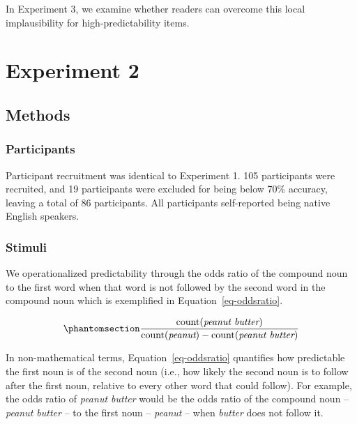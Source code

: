\documentclass[
  12pt,
  letterpaper,
]{scrreprt}
\begin{document}
In Experiment 3, we examine whether readers can overcome this local
implausibility for high-predictability items.

\section{Experiment 2}\label{experiment-2}

\subsection{Methods}\label{methods-1}

\subsubsection{Participants}\label{participants-1}

Participant recruitment was identical to Experiment 1. 105 participants
were recruited, and 19 participants were excluded for being below 70\%
accuracy, leaving a total of 86 participants. All participants
self-reported being native English speakers.

\subsubsection{Stimuli}\label{stimuli-1}

We operationalized predictability through the odds ratio of the compound
noun to the first word when that word is not followed by the second word
in the compound noun which is exemplified in
Equation~\ref{eq-oddsratio}.

\begin{equation}\phantomsection\label{eq-oddsratio}{
\frac{\mathrm{count(\textit{peanut butter})}}{\mathrm{count(\textit{peanut})} - \mathrm{count(\textit{peanut butter})}} 
}\end{equation}

In non-mathematical terms, Equation~\ref{eq-oddsratio} quantifies how
predictable the first noun is of the second noun (i.e., how likely the
second noun is to follow after the first noun, relative to every other
word that could follow). For example, the odds ratio of \emph{peanut
butter} would be the odds ratio of the compound noun -- \emph{peanut
butter} -- to the first noun -- \emph{peanut} -- when \emph{butter} does
not follow it.
\end{document}
